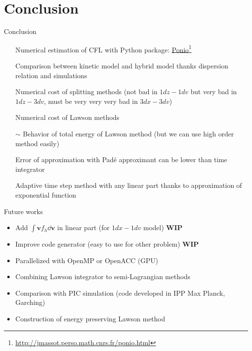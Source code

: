 \documentclass{beamer}
\newcommand{\cmark}{{\color{dgreen}\ding{52}}}
\newcommand{\xmark}{{\color{mred}\ding{55}}}
\newcommand{\bmark}{{\color{morange}$\sim$}}
\newcommand{\mbold}[1]{{\textbf{\color{PLB}#1}}}
\newcommand{\Mvb}[1]{\boldsymbol{#1}}
\begin{document}
\section{Conclusion}
\begin{frame}{Conclusion}
  \begin{enumerate}
    \item[\cmark] Numerical estimation of CFL with Python package: \href{http://jmassot.perso.math.cnrs.fr/ponio.html}{Ponio}\footnote{\url{http://jmassot.perso.math.cnrs.fr/ponio.html}}
    \item[\cmark] Comparison between kinetic model and hybrid model thanks dispersion relation and simulations
    \item[\xmark] Numerical cost of splitting methods (not bad in $1dz-1dv$ but very bad in $1dz-3dv$, must be very very very bad in $3dx-3dv$)
    \item[\cmark] Numerical cost of Lawson methods
    \item[\bmark] Behavior of total energy of Lawson method (but we can use high order method easily)
    \item[\cmark] Error of approximation with Padé approximant can be lower than time integrator
    \item[\cmark] Adaptive time step method with any linear part thanks to approximation of exponential function
  \end{enumerate}
\end{frame}
\begin{frame}{Future works}
  \begin{itemize}
    \item Add $\int \Mvb{v}f_h\dd{\Mvb{v}}$ in linear part (for $1dx-1dv$ model) \mbold{WIP}
    \item Improve code generator (easy to use for other problem) \mbold{WIP}
    \item Parallelized with OpenMP or OpenACC (GPU)
    \item Combining Lawson integrator to semi-Lagrangian methods
    \item Comparison with PIC simulation (code developed in IPP Max Planck, Garching)
    \item Construction of energy preserving Lawson method
  \end{itemize}
\end{frame}

\end{document}
